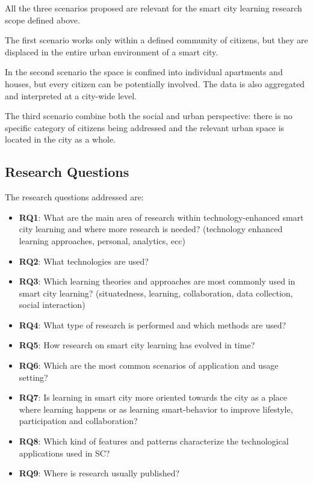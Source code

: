 All the three scenarios proposed are relevant for the smart city learning research scope defined above.

The first scenario works only within a defined community of citizens, but they are displaced in the entire urban environment of a smart city.

In the second scenario the space is confined into individual apartments and houses, but every citizen can be potentially involved. The data is also aggregated and interpreted at a city-wide level.

The third scenario combine both the social and urban perspective: there is no specific category of citizens being addressed and the relevant urban space is located in the city as a whole.


\subsection{Research Questions}
The research questions addressed are:

\begin{itemize}
\item \textbf{RQ1}: What are the main area of research within technology-enhanced smart city learning and where more research is needed? (technology enhanced learning approaches, personal, analytics, ecc)
\item \textbf{RQ2}: What technologies are used?
\item \textbf{RQ3}: Which learning theories and approaches are most commonly used in smart city learning? (situatedness, learning, collaboration, data collection, social interaction)
\item \textbf{RQ4}: What type of research is performed and which methods are used?
\item \textbf{RQ5}: How research on smart city learning has evolved in time?
\item \textbf{RQ6}: Which are the most common scenarios of application and usage setting?
\item \textbf{RQ7}: Is learning in smart city more oriented towards the city as a place where learning happens or as learning smart-behavior to improve lifestyle, participation and collaboration?
\item \textbf{RQ8}: Which kind of features and patterns characterize the technological applications used in SC?
\item \textbf{RQ9}: Where is research usually published?
\end{itemize}